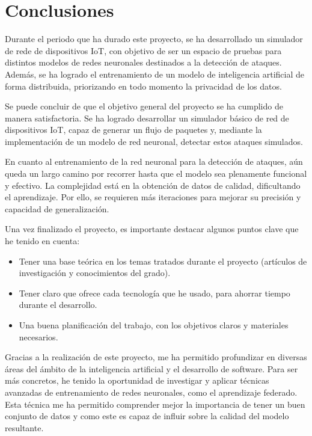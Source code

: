 
\section{Conclusiones}
\label{sec:Conclusiones}
Durante el periodo que ha durado este proyecto, se ha desarrollado un simulador de rede de dispositivos IoT, con objetivo de ser un espacio de pruebas para distintos modelos de redes neuronales destinados a la detección de ataques. Además, se ha logrado el entrenamiento de un modelo de inteligencia artificial de forma distribuida, priorizando en todo momento la privacidad de los datos.

Se puede concluir de que el objetivo general del proyecto se ha cumplido de manera satisfactoria. Se ha logrado desarrollar un simulador básico de red de dispositivos IoT, capaz de generar un flujo de paquetes y, mediante la implementación de un modelo de red neuronal, detectar estos ataques simulados. 

En cuanto al entrenamiento de la red neuronal para la detección de ataques, aún queda un largo camino por recorrer hasta que el modelo sea plenamente funcional y efectivo. La complejidad está en la obtención de datos de calidad, dificultando el aprendizaje. Por ello, se requieren más iteraciones para mejorar su precisión y capacidad de generalización.

Una vez finalizado el proyecto, es importante destacar algunos puntos clave que he tenido en cuenta:
\begin{itemize}
    \item Tener una base teórica en los temas tratados durante el proyecto (artículos de investigación y conocimientos del grado).
    \item Tener claro que ofrece cada tecnología que he usado, para ahorrar tiempo durante el desarrollo.
    \item Una buena planificación del trabajo, con los objetivos claros y materiales necesarios.
\end{itemize}

Gracias a la realización de este proyecto, me ha permitido profundizar en diversas áreas del ámbito de la inteligencia artificial y el desarrollo de software. Para ser más concretos, he tenido la oportunidad de investigar y aplicar técnicas avanzadas de entrenamiento de redes neuronales, como el aprendizaje federado. Esta técnica me ha permitido comprender mejor la importancia de tener un buen conjunto de datos y como este es capaz de influir sobre la calidad del modelo resultante.

